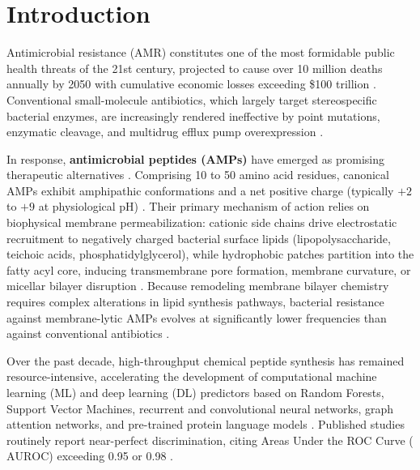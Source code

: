 \documentclass[11pt,a4paper]{article}
\begin{document}
\section{Introduction}

Antimicrobial resistance (AMR) constitutes one of the most formidable public health threats of the 21st century, projected to cause over 10 million deaths annually by 2050 with cumulative economic losses exceeding \$100 trillion \cite{oneill2016tackling}. Conventional small-molecule antibiotics, which largely target stereospecific bacterial enzymes, are increasingly rendered ineffective by point mutations, enzymatic cleavage, and multidrug efflux pump overexpression \cite{blair2015molecular}.

In response, \textbf{antimicrobial peptides (AMPs)} have emerged as promising therapeutic alternatives \cite{mahlapuu2016antimicrobial, lazzaro2020antimicrobial, hancock2006antimicrobial, kumar2018antimicrobial}. Comprising 10 to 50 amino acid residues, canonical AMPs exhibit amphipathic conformations and a net positive charge (typically $+2$ to $+9$ at physiological pH) \cite{zasloff2002antimicrobial}. Their primary mechanism of action relies on biophysical membrane permeabilization: cationic side chains drive electrostatic recruitment to negatively charged bacterial surface lipids (lipopolysaccharide, teichoic acids, phosphatidylglycerol), while hydrophobic patches partition into the fatty acyl core, inducing transmembrane pore formation, membrane curvature, or micellar bilayer disruption \cite{brogden2005antimicrobial, wimley2010describing, matsuzaki2009control, wimley2011antimicrobial}. Because remodeling membrane bilayer chemistry requires complex alterations in lipid synthesis pathways, bacterial resistance against membrane-lytic AMPs evolves at significantly lower frequencies than against conventional antibiotics \cite{spohn2019integrated}.

Over the past decade, high-throughput chemical peptide synthesis has remained resource-intensive, accelerating the development of computational machine learning (ML) and deep learning (DL) predictors based on Random Forests, Support Vector Machines, recurrent and convolutional neural networks, graph attention networks, and pre-trained protein language models \cite{lin2023evolutionary, yan2020deep, notin2023proteingym, veltri2018deep, li2022amplify, santos2020macrel, xu2023iampcn, sharma2021deep, burdukiewicz2020ampgram, capecchi2021machine, yan2021samppfp, ma2022identification}. Published studies routinely report near-perfect discrimination, citing Areas Under the ROC Curve ($\text{AUROC}$) exceeding 0.95 or 0.98 \cite{yan2020deep, veltri2018deep, xu2023iampcn}.
\end{document}
